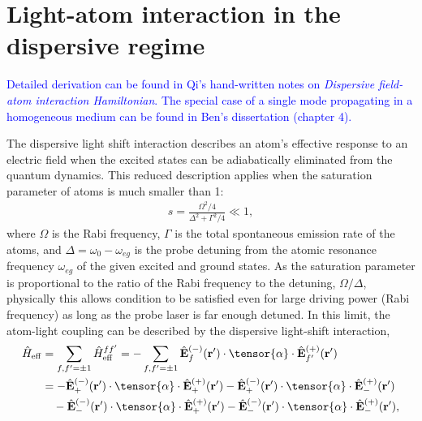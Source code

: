 \documentclass[preprint,aps,pra,onecolumn]{revtex4-1} %
\begin{document}

\section{Light-atom interaction in the dispersive regime}\label{sec:lightatominteract}
\textcolor{blue}{Detailed derivation can be found in Qi's hand-written notes on \textit{Dispersive field-atom interaction Hamiltonian}. The special case of a single mode propagating in a homogeneous medium can be found in Ben's dissertation (chapter 4). }


The dispersive light shift interaction describes an atom's effective response to an electric field when the excited states can be adiabatically eliminated from the quantum dynamics.  This reduced description applies when the saturation parameter of atoms is much smaller than 1:
\begin{align} \label{Eq::SatParameter}
	s = \frac{ \Omega^2/4}{\Delta^2 + \Gamma^2/4} \ll 1,  
\end{align}
where $\Omega$ is the Rabi frequency, $\Gamma$ is the total spontaneous emission rate of the atoms, and $\Delta = \omega_0 - \omega_{eg}$ is the probe detuning from the atomic resonance frequency $\omega_{eg}$ of the given excited and ground states. As the saturation parameter is proportional to the ratio of the Rabi frequency to the detuning, $\Omega/\Delta$, physically this allows condition  to be satisfied even for large driving power (Rabi frequency) as long as the probe laser is far enough detuned.  In this limit, the atom-light coupling can be described by the dispersive light-shift interaction,
\begin{align} 
	\hat{H}_{\rm eff} & = \sum_{f,f'=\pm 1}\hat{H}_{\rm eff}^{ff'} =- \sum_{f,f'=\pm 1}\hat{\mathbf{E}}^{(-)}_f(\mathbf{r}' ) \cdot \tensor{\alpha} \cdot \hat{\mathbf{E}}^{(+)}_{f'}(\mathbf{r}' )\\
	&= - \hat{\mathbf{E}}^{(-)}_+(\mathbf{r}' ) \cdot \tensor{\alpha} \cdot \hat{\mathbf{E}}^{(+)}_+(\mathbf{r}' )
	- \hat{\mathbf{E}}^{(-)}_+(\mathbf{r}' ) \cdot \tensor{\alpha} \cdot \hat{\mathbf{E}}^{(+)}_-(\mathbf{r}' )\nonumber\\
	&\quad - \hat{\mathbf{E}}^{(-)}_-(\mathbf{r}' ) \cdot \tensor{\alpha} \cdot \hat{\mathbf{E}}^{(+)}_+(\mathbf{r}' )
	- \hat{\mathbf{E}}^{(-)}_-(\mathbf{r}' ) \cdot \tensor{\alpha} \cdot \hat{\mathbf{E}}^{(+)}_-(\mathbf{r}' ), \label{Eq::LightShiftHam}
\end{align}
\end{document}

